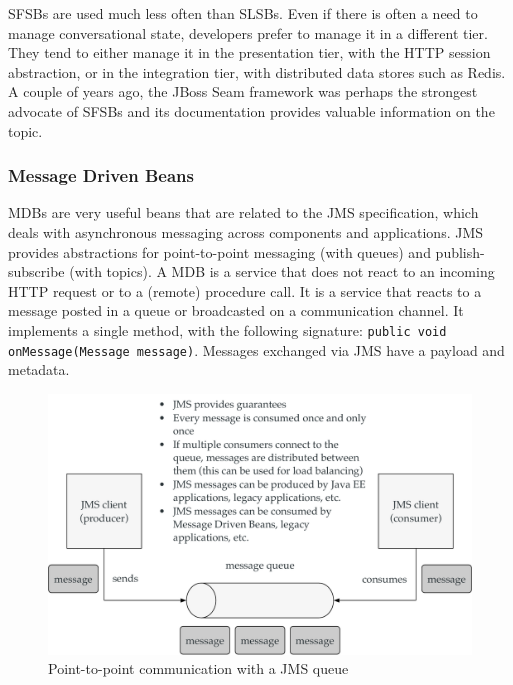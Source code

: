 \ac{SFSB}s are used much less often than \ac{SLSB}s. Even if there is often a need to manage conversational state, developers prefer to manage it in a different tier. They tend to either manage it in the presentation tier, with the HTTP session abstraction, or in the integration tier, with distributed data stores such as Redis. A couple of years ago, the JBoss Seam framework was perhaps the strongest advocate of \ac{SFSB}s and its documentation provides valuable information on the topic.


\subsubsection{Message Driven Beans}


\ac{MDB}s are very useful beans that are related to the \ac{JMS} specification, which deals with asynchronous messaging across components and applications. \ac{JMS} provides abstractions for point-to-point messaging (with queues) and publish-subscribe (with topics). A \ac{MDB} is a service that does not react to an incoming HTTP request or to a (remote) procedure call. It is a service that reacts to a message posted in a queue or broadcasted on a communication channel. It implements a single method, with the following signature: \texttt{public void onMessage(Message message)}. Messages exchanged via \ac{JMS} have a payload and metadata.

\begin{figure}[]
	\centering
    \includegraphics[width=1.0\linewidth]{Figures/jms-queue.pdf}
	\caption{Point-to-point communication with a JMS queue}
  \label{fig:jms-queue}
\end{figure}

